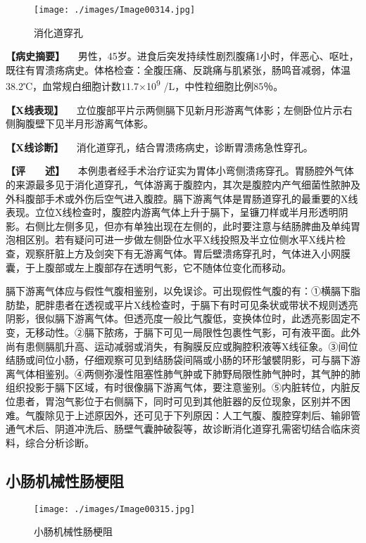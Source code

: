 \begin{figure}[!htbp]
 \centering
 \texttt{[image: ./images/Image00314.jpg]}
 \captionsetup{justification=centering}
 \caption{消化道穿孔}
 \label{fig5-7-1}
  \end{figure} 

\textbf{【病史摘要】}
　男性，45岁。进食后突发持续性剧烈腹痛1小时，伴恶心、呕吐，既往有胃溃疡病史。体格检查：全腹压痛、反跳痛与肌紧张，肠鸣音减弱，体温38.2℃，血常规白细胞计数11.7×10\textsuperscript{9}
/L，中性粒细胞比例85％。

\textbf{【X线表现】}
　立位腹部平片示两侧膈下见新月形游离气体影；左侧卧位片示右侧胸腹壁下见半月形游离气体影。

\textbf{【X线诊断】} 　消化道穿孔，结合胃溃疡病史，诊断胃溃疡急性穿孔。

\textbf{【评　　述】}
　本例患者经手术治疗证实为胃体小弯侧溃疡穿孔。胃肠腔外气体的来源最多见于消化道穿孔，气体游离于腹腔内，其次是腹腔内产气细菌性脓肿及外科腹部手术或外伤后空气进入腹腔。膈下游离气体是胃肠道穿孔的最重要的X线表现。立位X线检查时，腹腔内游离气体上升于膈下，呈镰刀样或半月形透明阴影。右侧比左侧多见，但亦有单独出现在左侧的，此时要注意与结肠脾曲及单纯胃泡相区别。若有疑问可进一步做左侧卧位水平X线投照及半立位侧水平X线片检查，观察肝脏上方及剑突下有无游离气体。胃后壁溃疡穿孔时，气体进入小网膜囊，于上腹部或左上腹部存在透明气影，它不随体位变化而移动。

膈下游离气体应与假性气腹相鉴别，以免误诊。可出现假性气腹的有：①横膈下脂肪垫，肥胖患者在透视或平片X线检查时，于膈下有时可见条状或带状不规则透亮阴影，很似膈下游离气体。但透亮度一般比气腹低，变换体位时，此透亮影固定不变，无移动性。②膈下脓疡，于膈下可见一局限性包裹性气影，可有液平面。此外尚有患侧膈肌升高、运动减弱或消失，有胸膜反应或胸腔积液等X线征象。③间位结肠或间位小肠，仔细观察可见到结肠袋间隔或小肠的环形皱襞阴影，可与膈下游离气体相鉴别。④两侧弥漫性阻塞性肺气肿或下肺野局限性肺气肿时，其气肿的肺组织投影于膈下区域，有时很像膈下游离气体，要注意鉴别。⑤内脏转位，内脏反位患者，胃泡气影位于右侧膈下，同时可见到其他脏器的反位现象，区别并不困难。气腹除见于上述原因外，还可见于下列原因：人工气腹、腹腔穿刺后、输卵管通气术后、阴道冲洗后、肠壁气囊肿破裂等，故诊断消化道穿孔需密切结合临床资料，综合分析诊断。

\subsection{小肠机械性肠梗阻}

\begin{figure}[!htbp]
 \centering
 \texttt{[image: ./images/Image00315.jpg]}
 \captionsetup{justification=centering}
 \caption{小肠机械性肠梗阻}
 \label{fig5-7-2}
  \end{figure} 

